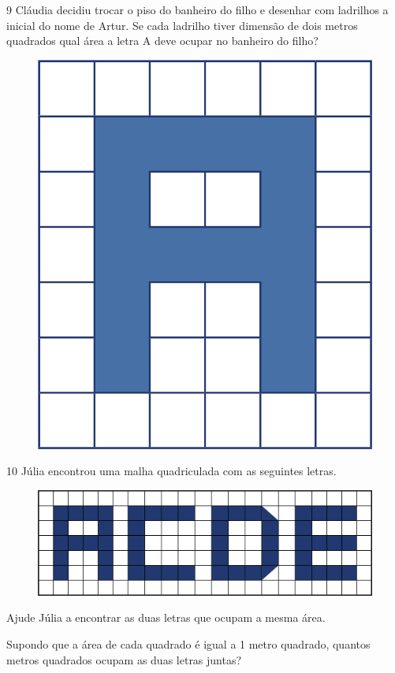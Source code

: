\num{9} Cláudia decidiu trocar o piso do banheiro do filho e desenhar com ladrilhos 
a inicial do nome de Artur. Se cada ladrilho tiver dimensão de dois metros quadrados 
qual área a letra A deve ocupar no banheiro do filho?

\begin{figure}[htpb!]
\centering
\includegraphics[width=.3\textwidth]{media/image29.png}
\end{figure}



\num{10} Júlia encontrou uma malha quadriculada com as seguintes letras.

\begin{figure}[htpb!]
\centering
\includegraphics[width=.6\textwidth]{media/image34.png}
\end{figure}

\begin{escolha}
\item Ajude Júlia a encontrar as duas letras que ocupam a mesma área. \\

\item Supondo que a área de cada quadrado é igual a 1 metro quadrado, 
quantos metros quadrados ocupam as duas letras juntas?\\

\end{escolha}

